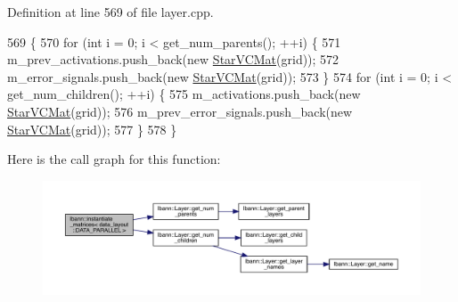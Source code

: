 Definition at line 569 of file layer.\+cpp.


\begin{DoxyCode}
569                                                                              \{
570   \textcolor{keywordflow}{for} (\textcolor{keywordtype}{int} i = 0; i < get\_num\_parents(); ++i) \{
571     m\_prev\_activations.push\_back(\textcolor{keyword}{new} \hyperlink{base_8hpp_aa4ec814c4a8f15b4ea2b24b3af94ef23}{StarVCMat}(grid));
572     m\_error\_signals.push\_back(\textcolor{keyword}{new} \hyperlink{base_8hpp_aa4ec814c4a8f15b4ea2b24b3af94ef23}{StarVCMat}(grid));
573   \}
574   \textcolor{keywordflow}{for} (\textcolor{keywordtype}{int} i = 0; i < get\_num\_children(); ++i) \{
575     m\_activations.push\_back(\textcolor{keyword}{new} \hyperlink{base_8hpp_aa4ec814c4a8f15b4ea2b24b3af94ef23}{StarVCMat}(grid));
576     m\_prev\_error\_signals.push\_back(\textcolor{keyword}{new} \hyperlink{base_8hpp_aa4ec814c4a8f15b4ea2b24b3af94ef23}{StarVCMat}(grid));
577   \}
578 \}
\end{DoxyCode}
Here is the call graph for this function\+:\nopagebreak
\begin{figure}[H]
\begin{center}
\leavevmode
\includegraphics[width=350pt]{namespacelbann_af3507a38f8992e27898d63551a987341_cgraph}
\end{center}
\end{figure}
\mbox{\label{namespacelbann_a32006e2c89920b1ff6e8a2318650dd7f}} 
